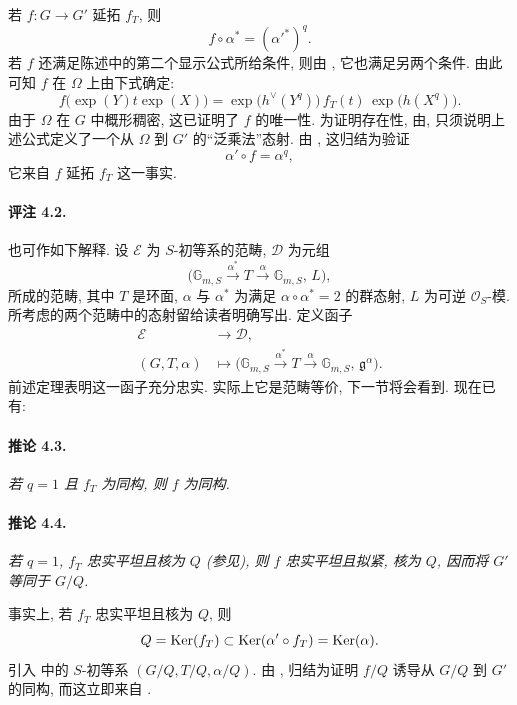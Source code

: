 若 \(f\colon G\to G'\) 延拓 \(f_T\), 则
\[
  f\circ\alpha^\ast=(\alpha'^\ast)^q.
\]
若 \(f\) 还满足陈述中的第二个显示公式所给条件, 则由 , 它也满足另两个条件. 由此可知 \(f\) 在 \(\Omega\) 上由下式确定:
\[
  f\bigl(\exp(Y)t\exp(X)\bigr)
  =
  \exp\bigl(h^\vee(Y^q)\bigr)\,
  f_T(t)\,
  \exp\bigl(h(X^q)\bigr).
\]
由于 \(\Omega\) 在 \(G\) 中概形稠密, 这已证明了 \(f\) 的唯一性. 为证明存在性, 由, 只须说明上述公式定义了一个从 \(\Omega\) 到 \(G'\) 的“泛乘法”态射. 由 , 这归结为验证
\[
  \alpha'\circ f=\alpha^q,
\]
它来自 \(f\) 延拓 \(f_T\) 这一事实.

\paragraph{\textbf{评注 4.2.}}
 也可作如下解释. 设 \(\mathcal E\) 为 \(S\)-初等系的范畴, \(\mathcal D\) 为元组
\[
  \bigl(
    \mathbb G_{m,S}\xrightarrow{\alpha^\ast}T
    \xrightarrow{\alpha}\mathbb G_{m,S},\,L
  \bigr),
\]
所成的范畴, 其中 \(T\) 是环面, \(\alpha\) 与 \(\alpha^\ast\) 为满足 \(\alpha\circ\alpha^\ast=2\) 的群态射, \(L\) 为可逆 \(\mathcal O_S\)-模. 所考虑的两个范畴中的态射留给读者明确写出. 定义函子
\[
\begin{aligned}
  \mathcal E&\longrightarrow\mathcal D,\\
  (G,T,\alpha)&\longmapsto
  \bigl(
    \mathbb G_{m,S}\xrightarrow{\alpha^\ast}T
    \xrightarrow{\alpha}\mathbb G_{m,S},\,
    \mathfrak g^\alpha
  \bigr).
\end{aligned}
\]
前述定理表明这一函子充分忠实. 实际上它是范畴等价, 下一节将会看到. 现在已有:

\paragraph{\textbf{推论 4.3.}}
\emph{若 \(q=1\) 且 \(f_T\) 为同构, 则 \(f\) 为同构.}

\paragraph{\textbf{推论 4.4.}}
\emph{若 \(q=1\), \(f_T\) 忠实平坦且核为 \(Q\) \textup{(参见)}, 则 \(f\) 忠实平坦且拟紧, 核为 \(Q\), 因而将 \(G'\) 等同于 \(G/Q\).}

事实上, 若 \(f_T\) 忠实平坦且核为 \(Q\), 则
\[
  Q=\operatorname{Ker}(f_T)
  \subset\operatorname{Ker}(\alpha'\circ f_T)
  =\operatorname{Ker}(\alpha).
\]
引入  中的 \(S\)-初等系 \((G/Q,T/Q,\alpha/Q)\). 由 , 归结为证明 \(f/Q\) 诱导从 \(G/Q\) 到 \(G'\) 的同构, 而这立即来自 .

